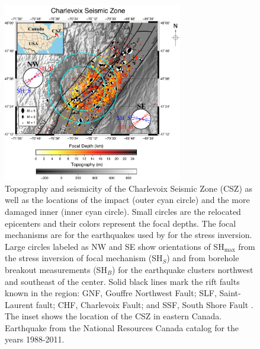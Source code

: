 \documentclass[draft]{agujournal2018}
\begin{document}
\begin{figure}[h]
\centering
\includegraphics[width=18.5pc]{Figures/Map_of_CSZ_2.png} 
\caption{Topography and seismicity of the Charlevoix Seismic Zone (CSZ) as well as the locations of the impact  (outer cyan circle) and the more damaged inner  (inner cyan circle). Small circles  are the relocated epicenters \citep{Powell_2017}  and their colors represent the focal depths. The focal mechanisms are for the earthquakes used by \citet{Mazzotti_2010} for the stress inversion. Large circles labeled as NW and SE show orientations of SH$_{\max}$ from the stress inversion of focal mechanism (SH$_S$) and from borehole breakout measurements (SH$_B$) for the earthquake clusters northwest and southeast of the  center. Solid black lines mark the rift faults known in the region: GNF, Gouffre Northwest Fault; SLF, Saint-Laurent fault; CHF, Charlevoix Fault; and SSF, South Shore Fault \citep{Rondot_1971,lamontagne1999}. The inset shows the location of the CSZ in eastern Canada. Earthquake  from the National Resources Canada catalog for the years 1988-2011.}
\label{figone}
\end{figure}
\end{document}
